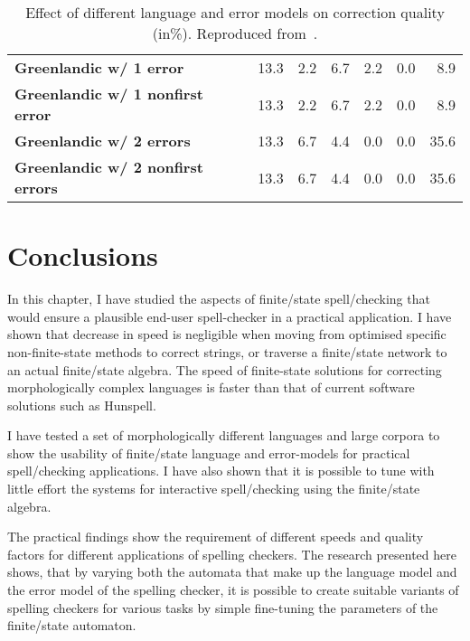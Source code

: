 \documentclass[officiallayout,final]{unihelcompling}
\begin{document}
\begin{table}
\begin{tabular}{|l|r|r|r|r|r|r|}
        \hline
          \bf Greenlandic w/ 1 error & 13.3 & 2.2 & 6.7 & 2.2 & 0.0 & 8.9 \\
 \bf Greenlandic w/ 1 nonfirst error & 13.3 & 2.2 & 6.7 & 2.2 & 0.0 & 8.9 \\
         \bf Greenlandic w/ 2 errors & 13.3 & 6.7 & 4.4 & 0.0 & 0.0 & 35.6 \\
\bf Greenlandic w/ 2 nonfirst errors & 13.3 & 6.7 & 4.4 & 0.0 & 0.0 & 35.6 \\
        \hline
    \end{tabular}

    \caption{Effect of different language and error models on correction 
        quality (in\%). Reproduced from~.
    \label{table:nejlt-2013-repro}}
\end{table}

\section{Conclusions}

In this chapter, I have studied the aspects of finite\-/state spell\-/checking
that would ensure a plausible end-user spell-checker in a practical application. I
have shown that decrease in speed is negligible when moving from
optimised specific non-finite-state methods to correct strings, or traverse
a finite\-/state network to an actual finite\-/state algebra. The
speed of finite-state solutions for correcting morphologically complex
languages is faster than that of current software solutions such as Hunspell.

I have tested a set of morphologically different languages and large corpora to
show the usability of finite\-/state language and error-models for practical
spell\-/checking applications. I have also shown that it is possible to tune
with little effort the systems for interactive spell\-/checking using the
finite\-/state algebra.

The practical findings show the requirement of different speeds and quality
factors for different applications of spelling checkers. The research
presented here shows, that by varying both the automata that make up the
language model and the error model of the spelling checker, it is possible to
create suitable variants of spelling checkers for various tasks by simple
fine-tuning the parameters of the finite\-/state automaton.
\end{document}

